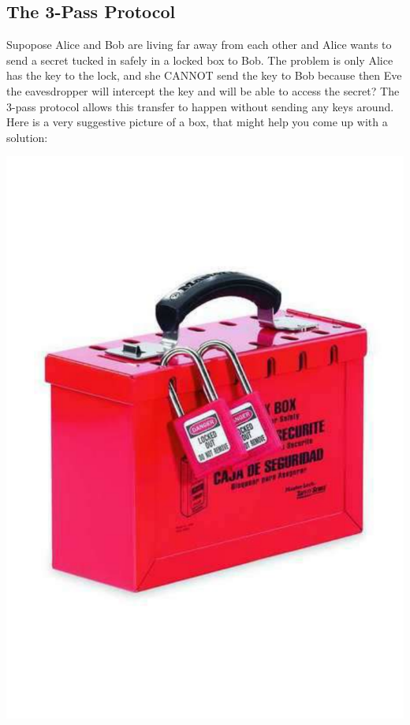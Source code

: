 \documentclass[12pt]{article}
\theoremstyle{plain}
\theoremstyle{definition}
\theoremstyle{remark}
\begin{document}
\subsection{The 3-Pass Protocol}
Supopose Alice and Bob are living far away from each other and Alice wants to send a secret tucked in safely in a locked box to Bob. The problem is only Alice has the key to the lock, and she CANNOT send the key to Bob because then Eve the eavesdropper will intercept the key and will be able to access the secret? The 3-pass protocol allows this transfer to happen without sending any keys around. Here is a very suggestive picture of a box, that might help you come up with a solution:

\bigskip
\noindent
\begin{center}
    \includegraphics[scale=.35]{Z10BLufo5oy.pdf} 
\end{center}
\end{document}
